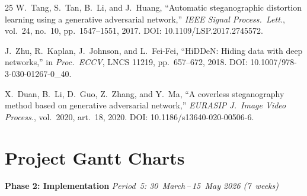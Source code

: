 \documentclass[10pt,twocolumn,a4paper]{article}
\begin{document}
\begin{thebibliography}{25}
W.~Tang, S.~Tan, B.~Li, and J.~Huang,
``Automatic steganographic distortion learning using a generative adversarial network,''
\textit{IEEE Signal Process.\ Lett.}, vol.~24, no.~10, pp.~1547--1551, 2017.
DOI: 10.1109/LSP.2017.2745572.

J.~Zhu, R.~Kaplan, J.~Johnson, and L.~Fei-Fei,
``HiDDeN: Hiding data with deep networks,''
in \textit{Proc.\ ECCV}, LNCS 11219, pp.~657--672, 2018.
DOI: 10.1007/978-3-030-01267-0\_40.

X.~Duan, B.~Li, D.~Guo, Z.~Zhang, and Y.~Ma,
``A coverless steganography method based on generative adversarial network,''
\textit{EURASIP J.\ Image Video Process.}, vol.~2020, art.~18, 2020.
DOI: 10.1186/s13640-020-00506-6.

\end{thebibliography}

\clearpage
\onecolumn
\appendix

\section{Project Gantt Charts}
\label{app:gantt}


\noindent\textbf{\large Phase 2: Implementation} \hfill
\textit{Period~5: 30~March\,--\,15~May 2026 (7~weeks)}

\vspace{6pt}
\end{document}
